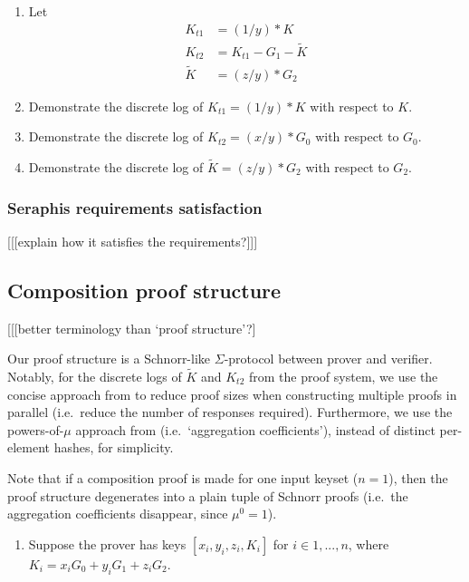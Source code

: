 \begin{appendices}
\begin{enumerate}
    \item Let
    \begin{align*}
        K_{t1} &= (1/y)*K \\
        K_{t2} &= K_{t1} - G_1 - \tilde{K} \\
        \tilde{K} &= (z/y)*G_2
    \end{align*}

    \item Demonstrate the discrete log of $K_{t1} = (1/y)*K$ with respect to $K$.

    \item Demonstrate the discrete log of $K_{t2} = (x/y)*G_0$ with respect to $G_0$.

    \item Demonstrate the discrete log of $\tilde{K} = (z/y)*G_2$ with respect to $G_2$.
\end{enumerate}

\subsubsection{Seraphis requirements satisfaction}

[[[explain how it satisfies the requirements?]]]


\subsection{Composition proof structure}
\label{appendix:composition-proof-structure}

[[[better terminology than `proof structure'?]

Our proof structure is a Schnorr-like $\Sigma$-protocol between prover and verifier. Notably, for the discrete logs of $\tilde{K}$ and $K_{t2}$ from the proof system, we use the concise approach from \cite{clsag-eprint} to reduce proof sizes when constructing multiple proofs in parallel (i.e.\ reduce the number of responses required). Furthermore, we use the powers-of-$\mu$ approach from \cite{triptych-preprint} (i.e.\ `aggregation coefficients'), instead of distinct per-element hashes, for simplicity.

Note that if a composition proof is made for one input keyset ($n = 1$), then the proof structure degenerates into a plain tuple of Schnorr proofs (i.e.\ the aggregation coefficients disappear, since $\mu^0 = 1$).

\begin{enumerate}
    \item Suppose the prover has keys $[x_i, y_i, z_i, K_i]$ for $i \in 1,...,n$, where $K_i = x_i G_0 + y_i G_1 + z_i G_2$.


\end{enumerate}
\end{appendices}
